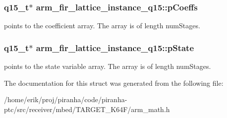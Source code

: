\subsubsection[{\texorpdfstring{p\+Coeffs}{pCoeffs}}]{\setlength{\rightskip}{0pt plus 5cm}q15\+\_\+t$\ast$ arm\+\_\+fir\+\_\+lattice\+\_\+instance\+\_\+q15\+::p\+Coeffs}\hypertarget{structarm__fir__lattice__instance__q15_a78f872826140069cf67836fff87360bc}{}\label{structarm__fir__lattice__instance__q15_a78f872826140069cf67836fff87360bc}
points to the coefficient array. The array is of length num\+Stages. 
\subsubsection[{\texorpdfstring{p\+State}{pState}}]{\setlength{\rightskip}{0pt plus 5cm}q15\+\_\+t$\ast$ arm\+\_\+fir\+\_\+lattice\+\_\+instance\+\_\+q15\+::p\+State}\hypertarget{structarm__fir__lattice__instance__q15_a37b90dea2bc3ee7c9951a9fe74db0cbb}{}\label{structarm__fir__lattice__instance__q15_a37b90dea2bc3ee7c9951a9fe74db0cbb}
points to the state variable array. The array is of length num\+Stages. 

The documentation for this struct was generated from the following file\+:\begin{DoxyCompactItemize}
\item 
/home/erik/proj/piranha/code/piranha-\/ptc/src/receiver/mbed/\+T\+A\+R\+G\+E\+T\+\_\+\+K64\+F/arm\+\_\+math.\+h\end{DoxyCompactItemize}
